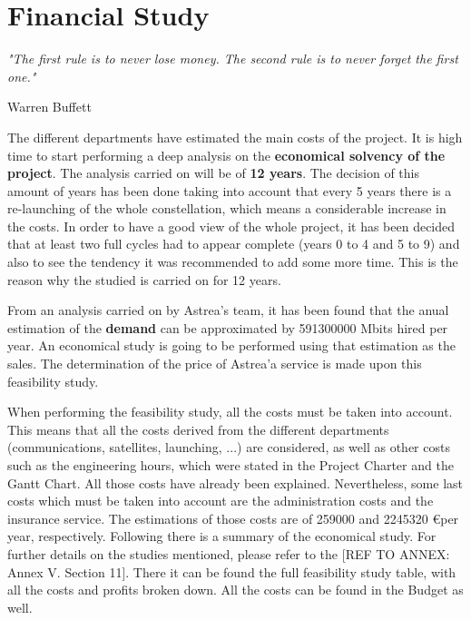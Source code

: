 \chapter{Financial Study}
\epigraph{\textit{"The first rule is to never lose money. The second rule is to never forget the first one."}}{Warren Buffett} 

The different departments have estimated the main costs of the project. It is high time to start performing a deep analysis on the \textbf{economical solvency of the project}. The analysis carried on will be of \textbf{12 years}. The decision of this amount of years has been done taking into account that every 5 years there is a re-launching of the whole constellation, which means a considerable increase in the costs. In order to have a good view of the whole project, it has been decided that at least two full cycles had to appear complete (years 0 to 4 and 5 to 9) and also to see the tendency it was recommended to add some more time. This is the reason why the studied is carried on for 12 years.

From an analysis carried on by Astrea's team, it has been found that the anual estimation of the \textbf{demand} can be approximated by 591300000 Mbits hired per year. An economical study is going to be performed using that estimation as the sales. The determination of the price of Astrea'a service is made upon this feasibility study. 

When performing the feasibility study, all the costs must be taken into account. This means that all the costs derived from the different departments (communications, satellites, launching, ...) are considered, as well as other costs such as the engineering hours, which were stated in the Project Charter and the Gantt Chart. All those costs have already been explained. Nevertheless, some last costs which must be taken into account are the administration costs and the insurance service. The estimations of those costs are of 259000 and 2245320 \euro  per year, respectively. Following there is a summary of the economical study. For further details on the studies mentioned, please refer to the [{REF TO ANNEX: Annex V. Section 11}]. There it can be found the full feasibility study table, with all the costs and profits broken down. All the costs can be found in the Budget as well.




